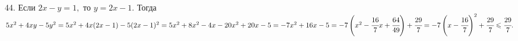 44. Если $2x-y=1,$ то $y=2x-1.$ Тогда $5x^2+4xy-5y^2=5x^2+4x(2x-1)-5(2x-1)^2=5x^2+8x^2-4x-20x^2+20x-5=-7x^2+16x-5=-7\left(x^2-\cfrac{16}{7}x+\cfrac{64}{49}\right)+\cfrac{29}{7}=
-7\left(x-\cfrac{16}{7}\right)^2+\cfrac{29}{7}\leqslant\cfrac{29}{7}.$\\

